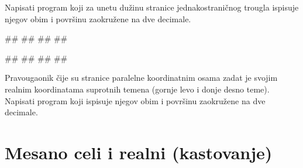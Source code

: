 \begin{Exercise}[label=p1.1_03] 
Napisati program koji za unetu dužinu stranice jednakostraničnog trougla ispisuje njegov obim i površinu zaokružene na dve decimale. 

\begin{miditest}
\begin{upotreba}{1}
#\naslovInt#
##
##
##
\end{upotreba}
\end{miditest}
\begin{miditest}
\begin{upotreba}{1}
#\naslovInt#
##
##
##
\end{upotreba}
\end{miditest}
\end{Exercise}
\begin{Answer}[ref=p1.1_03]
\end{Answer}


\begin{Exercise}[label=p1_13] 
Pravougaonik čije su stranice paralelne koordinatnim osama zadat je svojim realnim koordinatama suprotnih temena (gornje levo i donje desno teme). Napisati program koji ispisuje njegov obim i površinu zaokružene na dve decimale. 

\end{Exercise}
\begin{Answer}[ref=p1_13]
\end{Answer}

\section{Mesano celi i realni (kastovanje)}

